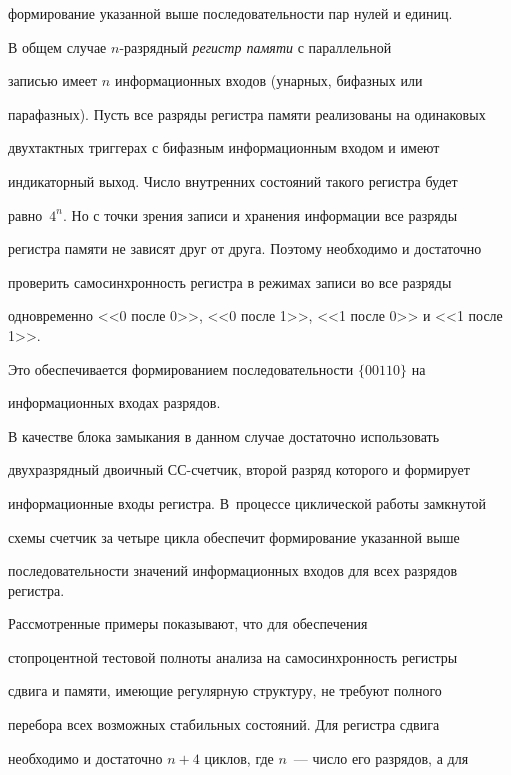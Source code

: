 формирование указанной выше последовательности пар нулей и единиц.


      


      В общем случае $n$-разрядный \textit{регистр памяти} с параллельной 


записью имеет $n$ информационных входов (унарных, бифазных или 


парафазных). Пусть все разряды регистра памяти реализованы на одинаковых 


двухтактных триггерах с бифазным информационным входом и имеют 


индикаторный выход. Число внутренних состояний такого регистра будет 


равно~$4^n$. Но с точки зрения записи и хранения информации все разряды 


регистра памяти не зависят друг от друга. Поэтому необходимо и достаточно 


проверить самосинхронность регистра в режимах записи во все разряды 


одновременно <<0 после 0>>, <<0 после 1>>, <<1 после 0>> и <<1 после 1>>. 


Это обеспечивается формированием последовательности $\{00110\}$ на 


информационных входах разрядов.


      


      В качестве блока замыкания в данном случае достаточно использовать 


двухразрядный двоичный СС-счет\-чик, второй разряд которого и формирует 


информационные входы регистра. В~процессе циклической работы замкнутой 


схемы счетчик за четыре цикла обеспечит формирование указанной выше 


последовательности значений информационных входов для всех разрядов регистра.


      


      Рассмотренные примеры показывают, что для обеспечения 


стопроцентной тестовой полноты анализа на самосинхронность регистры 


сдвига и памяти, имеющие регулярную структуру, не требуют полного 


перебора всех возможных стабильных состояний. Для регистра сдвига 


необходимо и достаточно $n+4$ циклов, где $n$~--- число его разрядов, а для 


